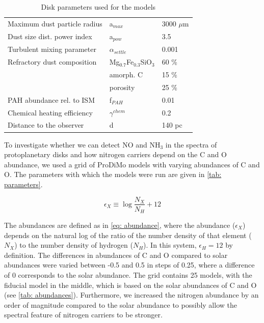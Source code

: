 \documentclass[twoside, single, authoryear, semicolon, 12pt]{lion-msc}
\newcommand{\4}{$_4$}
\newcommand{\3}{$_3$}
\newcommand{\2}{$_2$}
\begin{document}
\begin{table}[!ht]
\begin{tabular}{@{}lll@{}}
Maximum dust particle radius      & a$_{max}$                   & 3000 $\mu$m                \\
Dust size dist. power index       & a$_{pow}$                   & 3.5                        \\
Turbulent mixing parameter        & $\alpha_{settle}$           & 0.001                      \\
Refractory dust composition       & Mg$_{0.7}$Fe$_{0.3}$SiO\3 & 60 \%                      \\
                                  & amorph. C                   & 15 \%                      \\
                                  & porosity                    & 25 \%                      \\
PAH abundance rel. to ISM         & f$_{PAH}$                   & 0.01                       \\
Chemical heating efficiency       & $\gamma^{chem}$             & 0.2                        \\ \midrule
Distance to the observer          & d                           & 140 pc                     \\ \bottomrule
\end{tabular}
\caption{Disk parameters used for the models}
\label{tab: parameters}
\end{table}

To investigate whether we can detect NO and NH\3 in the spectra of protoplanetary disks and how nitrogen carriers depend on the C and O abundance, we used a grid of ProDiMo models with varying abundances of C and O. The parameters with which the models were run are given in \autoref{tab: parameters}.

\begin{equation}
    \epsilon_X\equiv\log\frac{N_X}{N_H}+12
\label{eq: abundance}
\end{equation}

The abundances are defined as in \autoref{eq: abundance}, where the abundance ($\epsilon_X$) depends on the natural log of the ratio of the number density of that element ($N_X$) to the number density of hydrogen ($N_H$). In this system, $\epsilon_H=12$ by definition. The differences in abundances of C and O compared to solar abundances were varied between -0.5 and 0.5 in steps of 0.25, where a difference of 0 corresponds to the solar abundance. The grid contains 25 models, with the fiducial model in the middle, which is based on the solar abundances of C and O (see \autoref{tab: abundances}). Furthermore, we increased the nitrogen abundance by an order of magnitude compared to the solar abundance to possibly allow the spectral feature of nitrogen carriers to be stronger.
\end{document}
